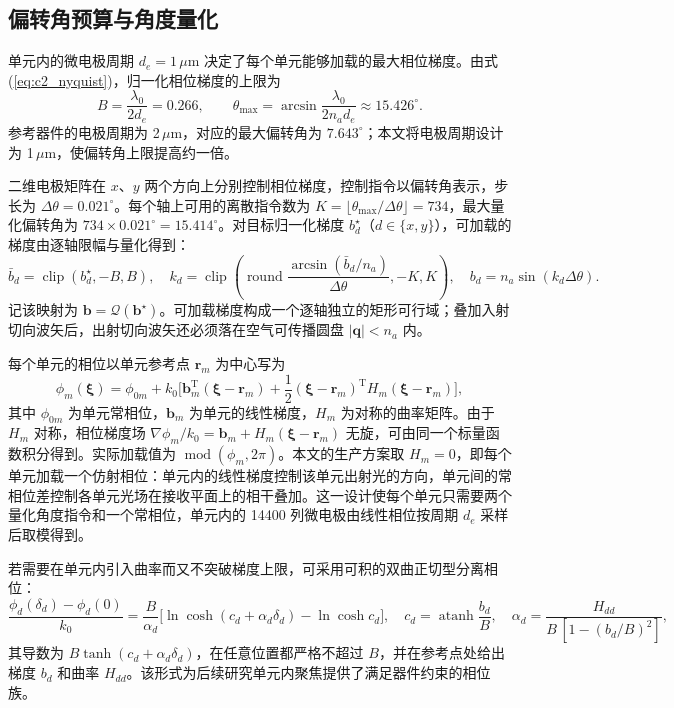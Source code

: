 \subsection{偏转角预算与角度量化}

单元内的微电极周期 $d_e=1\,\mu\mathrm m$ 决定了每个单元能够加载的最大相位梯度。由式(\ref{eq:c2_nyquist})，归一化相位梯度的上限为
\begin{equation}
B=\frac{\lambda_0}{2d_e}=0.266,\qquad
\theta_{\max}=\arcsin\frac{\lambda_0}{2n_ad_e}\approx15.426^\circ.
\label{eq:c3_budget}
\end{equation}
参考器件的电极周期为 2\,$\mu$m，对应的最大偏转角为 $7.643^\circ$；本文将电极周期设计为 1\,$\mu$m，使偏转角上限提高约一倍。

二维电极矩阵在 $x$、$y$ 两个方向上分别控制相位梯度，控制指令以偏转角表示，步长为 $\Delta\theta=0.021^\circ$。每个轴上可用的离散指令数为 $K=\lfloor\theta_{\max}/\Delta\theta\rfloor=734$，最大量化偏转角为 $734\times0.021^\circ=15.414^\circ$。对目标归一化梯度 $b_d^\star$（$d\in\{x,y\}$），可加载的梯度由逐轴限幅与量化得到：
\begin{equation}
\bar b_d=\operatorname{clip}(b_d^\star,-B,B),\quad
k_d=\operatorname{clip}\!\left(\operatorname{round}\frac{\arcsin(\bar b_d/n_a)}{\Delta\theta},-K,K\right),\quad
b_d=n_a\sin(k_d\Delta\theta).
\label{eq:c3_quant}
\end{equation}
记该映射为 $\mathbf b=\mathcal Q(\mathbf b^\star)$。可加载梯度构成一个逐轴独立的矩形可行域；叠加入射切向波矢后，出射切向波矢还必须落在空气可传播圆盘 $|\mathbf q|<n_a$ 内。

每个单元的相位以单元参考点 $\mathbf r_m$ 为中心写为
\begin{equation}
\phi_m(\boldsymbol\xi)=\phi_{0m}+k_0\Big[\mathbf b_m^{\mathrm T}(\boldsymbol\xi-\mathbf r_m)+\frac12(\boldsymbol\xi-\mathbf r_m)^{\mathrm T}H_m(\boldsymbol\xi-\mathbf r_m)\Big],
\label{eq:c3_phase}
\end{equation}
其中 $\phi_{0m}$ 为单元常相位，$\mathbf b_m$ 为单元的线性梯度，$H_m$ 为对称的曲率矩阵。由于 $H_m$ 对称，相位梯度场 $\nabla\phi_m/k_0=\mathbf b_m+H_m(\boldsymbol\xi-\mathbf r_m)$ 无旋，可由同一个标量函数积分得到。实际加载值为 $\operatorname{mod}(\phi_m,2\pi)$。本文的生产方案取 $H_m=0$，即每个单元加载一个仿射相位：单元内的线性梯度控制该单元出射光的方向，单元间的常相位差控制各单元光场在接收平面上的相干叠加。这一设计使每个单元只需要两个量化角度指令和一个常相位，单元内的 14400 列微电极由线性相位按周期 $d_e$ 采样后取模得到。

若需要在单元内引入曲率而又不突破梯度上限，可采用可积的双曲正切型分离相位：
\begin{equation}
\frac{\phi_d(\delta_d)-\phi_d(0)}{k_0}=\frac{B}{\alpha_d}\Big[\ln\cosh(c_d+\alpha_d\delta_d)-\ln\cosh c_d\Big],\quad
c_d=\operatorname{atanh}\frac{b_d}{B},\quad
\alpha_d=\frac{H_{dd}}{B\,[1-(b_d/B)^2]},
\label{eq:c3_tanh}
\end{equation}
其导数为 $B\tanh(c_d+\alpha_d\delta_d)$，在任意位置都严格不超过 $B$，并在参考点处给出梯度 $b_d$ 和曲率 $H_{dd}$。该形式为后续研究单元内聚焦提供了满足器件约束的相位族。

